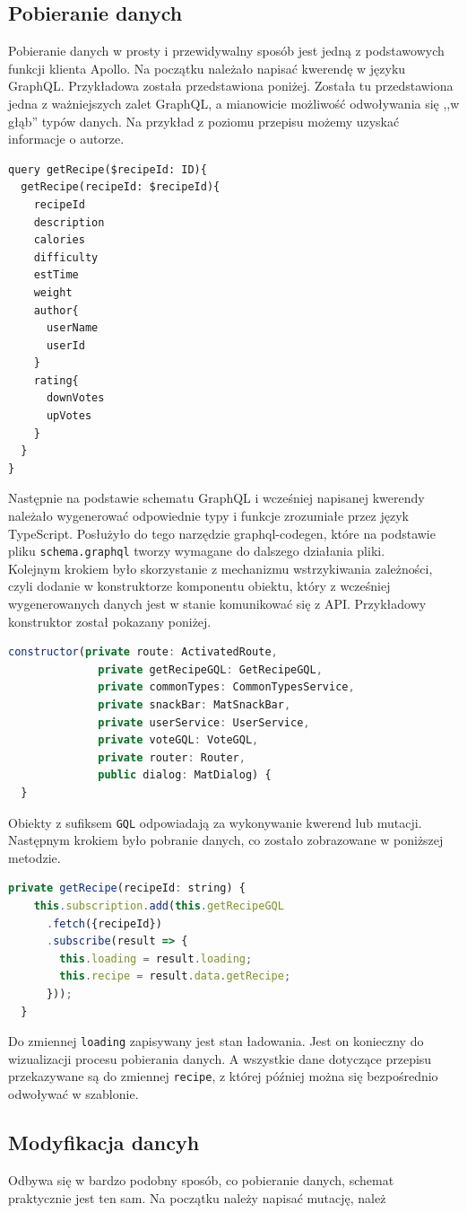 \subsection{Pobieranie danych}
Pobieranie danych w prosty i przewidywalny sposób jest jedną z podstawowych funkcji klienta Apollo.
Na początku należało napisać kwerendę w języku GraphQL. Przykładowa została przedstawiona poniżej. Została tu przedstawiona jedna z ważniejszych zalet GraphQL, a mianowicie możliwość odwoływania się ,,w głąb'' typów danych. Na przykład z poziomu przepisu możemy uzyskać informacje o autorze.
\begin{lstlisting}
query getRecipe($recipeId: ID){
  getRecipe(recipeId: $recipeId){
    recipeId
    description
    calories
    difficulty
    estTime
    weight
    author{
      userName
      userId
    }
    rating{
      downVotes
      upVotes
    }
  }
}
\end{lstlisting}
Następnie na podstawie schematu GraphQL i wcześniej napisanej kwerendy należało wygenerować odpowiednie typy i funkcje zrozumiałe przez język TypeScript. Posłużyło do tego narzędzie graphql-codegen, które na podstawie pliku \texttt{schema.graphql} tworzy wymagane do dalszego działania pliki.\\
Kolejnym krokiem było skorzystanie z mechanizmu wstrzykiwania zależności, czyli dodanie w konstruktorze komponentu obiektu, który z wcześniej wygenerowanych danych jest w stanie komunikować się z API. Przykładowy konstruktor został pokazany poniżej.
\begin{lstlisting}[language=JavaScript]
  constructor(private route: ActivatedRoute,
              private getRecipeGQL: GetRecipeGQL,
              private commonTypes: CommonTypesService,
              private snackBar: MatSnackBar,
              private userService: UserService,
              private voteGQL: VoteGQL,
              private router: Router,
              public dialog: MatDialog) {
  }
\end{lstlisting}
Obiekty z sufiksem \texttt{GQL} odpowiadają za wykonywanie kwerend lub mutacji.\\
Następnym krokiem było pobranie danych, co zostało zobrazowane w poniższej metodzie.
\begin{lstlisting}[language=JavaScript]
  private getRecipe(recipeId: string) {
    this.subscription.add(this.getRecipeGQL
      .fetch({recipeId})
      .subscribe(result => {
        this.loading = result.loading;
        this.recipe = result.data.getRecipe;
      }));
  }
  \end{lstlisting}
  Do zmiennej \texttt{loading} zapisywany jest stan ładowania. Jest on konieczny do wizualizacji procesu pobierania danych. A wszystkie dane dotyczące przepisu przekazywane są do zmiennej \texttt{recipe}, z której później można się bezpośrednio odwoływać w szablonie.
  \subsection{Modyfikacja dancyh}
  Odbywa się w bardzo podobny sposób, co pobieranie danych, schemat praktycznie jest ten sam. Na początku należy napisać mutację, należ